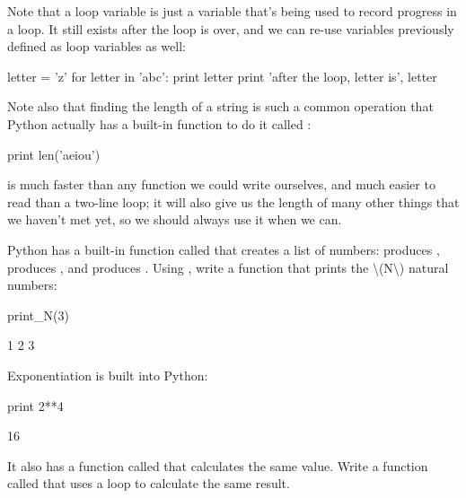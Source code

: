 Note that a loop variable is just a variable that's being used to record
progress in a loop. It still exists after the loop is over, and we can
re-use variables previously defined as loop variables as well:

\begin{VerbIn}
letter = 'z'
for letter in 'abc':
    print letter
print 'after the loop, letter is', letter
\end{VerbIn}

Note also that finding the length of a string is such a common operation
that Python actually has a built-in function to do it called
:

\begin{VerbIn}
print len('aeiou')
\end{VerbIn}

 is much faster than any function we could write ourselves,
and much easier to read than a two-line loop; it will also give us the
length of many other things that we haven't met yet, so we should always
use it when we can.

\begin{challenge}
  Python has a built-in function called  that creates a
  list of numbers:  produces \code{{[}0, 1, 2{]}},
   produces \code{{[}2, 3, 4{]}}, and
   produces \code{{[}2, 5, 8{]}}. Using
  , write a function that prints the
  \textbackslash{}(N\textbackslash{}) natural numbers:
\begin{VerbIn}
print_N(3)
\end{VerbIn}

\begin{VerbOut}
1 2 3
\end{VerbOut}
\end{challenge}

\begin{challenge}
  Exponentiation is built into Python:
\begin{VerbIn}
print 2**4
\end{VerbIn}

\begin{VerbOut}
16
\end{VerbOut}
  It also has a function called
   that calculates the same value. Write a function called
   that uses a loop to calculate the same result.
\end{challenge}

